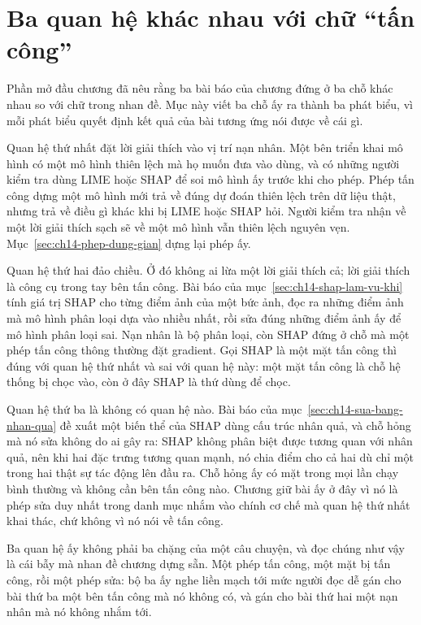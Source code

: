 \section{Ba quan hệ khác nhau với chữ \enquote{tấn công}}
\label{sec:ch14-ba-quan-he}

%
Phần mở đầu chương đã nêu rằng ba bài báo của chương đứng ở ba chỗ khác nhau so
với chữ trong nhan đề. Mục này viết ba chỗ ấy ra thành ba phát biểu, vì mỗi
phát biểu quyết định kết quả của bài tương ứng nói được về cái gì.

%
Quan hệ thứ nhất đặt lời giải thích vào vị trí nạn nhân. Một bên triển khai mô
hình có một mô hình thiên lệch mà họ muốn đưa vào dùng, và có những người kiểm
tra dùng LIME hoặc SHAP để soi mô hình ấy trước khi cho phép. Phép tấn công
dựng một mô hình mới trả về đúng dự đoán thiên lệch trên dữ liệu thật, nhưng
trả về điều gì khác khi bị LIME hoặc SHAP hỏi. Người kiểm tra nhận về một lời
giải thích sạch sẽ về một mô hình vẫn thiên lệch nguyên vẹn.
Mục~\ref{sec:ch14-phep-dung-gian} dựng lại phép ấy.

%
Quan hệ thứ hai đảo chiều. Ở đó không ai lừa một lời giải thích cả; lời giải
thích là công cụ trong tay bên tấn công. Bài báo của
mục~\ref{sec:ch14-shap-lam-vu-khi} tính giá trị SHAP cho từng điểm ảnh của một
bức ảnh, đọc ra những điểm ảnh mà mô hình phân loại dựa vào nhiều nhất, rồi sửa
đúng những điểm ảnh ấy để mô hình phân loại sai. Nạn nhân là bộ phân loại, còn
SHAP đứng ở chỗ mà một phép tấn công thông thường đặt gradient. Gọi SHAP là một
mặt tấn công thì đúng với quan hệ thứ nhất và sai với quan hệ này: một mặt tấn
công là chỗ hệ thống bị chọc vào, còn ở đây SHAP là thứ dùng để chọc.

%
Quan hệ thứ ba là không có quan hệ nào. Bài báo của
mục~\ref{sec:ch14-sua-bang-nhan-qua} đề xuất một biến thể của SHAP dùng cấu
trúc nhân quả, và chỗ hỏng mà nó sửa không do ai gây ra: SHAP không phân biệt
được tương quan với nhân quả, nên khi hai đặc trưng tương quan mạnh, nó chia
điểm cho cả hai dù chỉ một trong hai thật sự tác động lên đầu ra. Chỗ hỏng ấy
có mặt trong mọi lần chạy bình thường và không cần bên tấn công nào. Chương giữ
bài ấy ở đây vì nó là phép sửa duy nhất trong danh mục nhắm vào chính cơ chế mà
quan hệ thứ nhất khai thác, chứ không vì nó nói về tấn công.

Ba quan hệ ấy không phải ba chặng của một câu chuyện, và đọc chúng như vậy là
cái bẫy mà nhan đề chương dựng sẵn. Một phép tấn công, một mặt bị tấn công, rồi
một phép sửa: bộ ba ấy nghe liền mạch tới mức người đọc dễ gán cho bài thứ ba
một bên tấn công mà nó không có, và gán cho bài thứ hai một nạn nhân mà nó không
nhắm tới.

